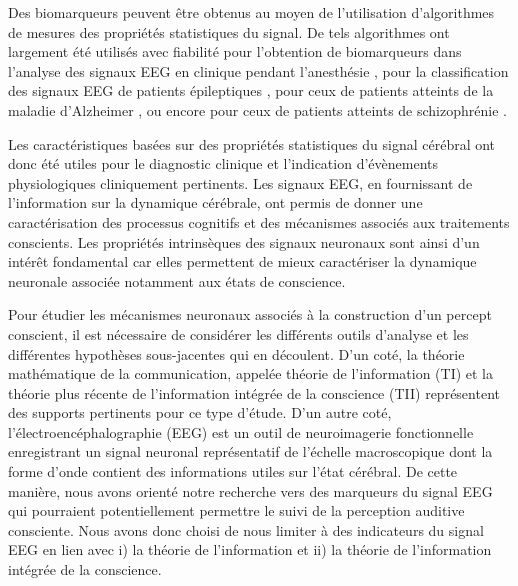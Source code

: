 Des biomarqueurs peuvent être obtenus au moyen de l'utilisation d'algorithmes de mesures des propriétés statistiques du signal. 
De tels algorithmes ont largement été utilisés avec fiabilité pour l'obtention de biomarqueurs dans l'analyse des signaux EEG en clinique pendant l'anesthésie \citep{engemann2018robust, engemann2020combining, liang2015eeg, sitt2014large}, pour la classification des signaux EEG de patients épileptiques \citep{amarantidis2019interpretation, giannakakis2013approach, helakari2019spectral, hornero1999estimating, hornero2003use, kannathal2005entropies, mirzaei2010eeg, uriguen2017comparison, yuan2011epileptic}, pour ceux de patients atteints de la maladie d'Alzheimer \citep{abasolo2008approximate, escudero2006analysis, pezard1998entropy, shumbayawonda2020complexity}, ou encore pour ceux de patients atteints de schizophrénie \citep{krishnan2020schizophrenia, sabeti2009entropy}. 

Les caractéristiques basées sur des propriétés statistiques du signal cérébral ont donc été utiles pour le diagnostic clinique et l'indication d'évènements physiologiques cliniquement pertinents. 
Les signaux EEG, en fournissant de l'information sur la dynamique cérébrale, ont permis de donner une caractérisation des processus cognitifs et des mécanismes associés aux traitements conscients. 
Les propriétés intrinsèques des signaux neuronaux sont ainsi d'un intérêt fondamental car elles permettent de mieux caractériser la dynamique neuronale associée notamment aux états de conscience. 

Pour étudier les mécanismes neuronaux associés à la construction d'un percept conscient, il est nécessaire de considérer les différents outils d'analyse et les différentes hypothèses sous-jacentes qui en découlent. 
D'un coté, la théorie mathématique de la communication, appelée théorie de l'information (TI) et la théorie plus récente de l'information intégrée de la conscience (TII) représentent des supports pertinents pour ce type d'étude. 
D'un autre coté, l'électroencéphalographie (EEG) est un outil de neuroimagerie fonctionnelle enregistrant un signal neuronal représentatif de l'échelle macroscopique dont la forme d'onde contient des informations utiles sur l'état cérébral. 
De cette manière, nous avons orienté notre recherche vers des marqueurs du signal EEG qui pourraient potentiellement permettre le suivi de la perception auditive consciente. 
Nous avons donc choisi de nous limiter à des indicateurs du signal EEG en lien avec i) la théorie de l'information et ii) la théorie de l'information intégrée de la conscience. 

